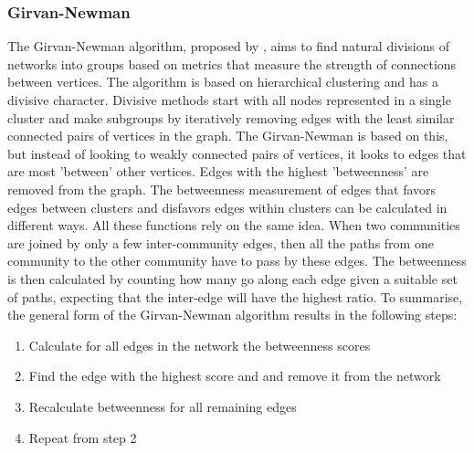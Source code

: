 \subsubsection{Girvan-Newman} 
The Girvan-Newman algorithm, proposed by \citeauthor{newman2004finding} \cite{newman2004finding}, aims to find natural divisions of networks into groups based on metrics that measure the strength of connections between vertices. The algorithm is based on hierarchical clustering and has a divisive character. Divisive methods start with all nodes represented in a single cluster and make subgroups by iteratively removing edges with the least similar connected pairs of vertices in the graph. The Girvan-Newman is based on this, but instead of looking to weakly connected pairs of vertices, it looks to edges that are most 'between' other vertices. Edges with the highest 'betweenness' are removed from the graph. The betweenness measurement of edges that favors edges between clusters and disfavors edges within clusters can be calculated in different ways. All these functions rely on the same idea. When two communities are joined by only a few inter-community edges, then all the paths from one community to the other community have to pass by these edges. The betweenness is then calculated by counting how many go along each edge given a suitable set of paths, expecting that the inter-edge will have the highest ratio. To summarise, the general form of the Girvan-Newman algorithm results in the following steps:

\begin{enumerate}
    \item Calculate for all edges in the network the betweenness scores
    \item Find the edge with the highest score and and remove it from the network
    \item Recalculate betweenness for all remaining edges
    \item Repeat from step 2
\end{enumerate}

